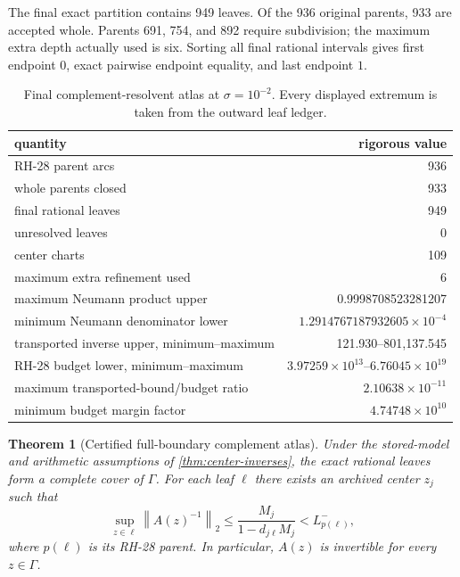 \documentclass[11pt]{article}
\newtheorem{theorem}{Theorem}[section]
\theoremstyle{definition}
\theoremstyle{remark}
\newcommand{\norm}[1]{\left\lVert#1\right\rVert}
\begin{document}
The final exact partition contains 949 leaves.  Of the 936 original parents,
933 are accepted whole.  Parents 691, 754, and 892 require subdivision; the
maximum extra depth actually used is six.  Sorting all final rational
intervals gives first endpoint $0$, exact pairwise endpoint equality, and
last endpoint $1$.

\begin{table}[H]
\centering
\caption{Final complement-resolvent atlas at $\sigma=10^{-2}$.  Every
displayed extremum is taken from the outward leaf ledger.}
\label{tab:atlas}
\begin{tabular}{lr}
\toprule
quantity & rigorous value\\
\midrule
RH-28 parent arcs & 936\\
whole parents closed & 933\\
final rational leaves & 949\\
unresolved leaves & 0\\
center charts & 109\\
maximum extra refinement used & 6\\
maximum Neumann product upper & 0.9998708523281207\\
minimum Neumann denominator lower
 & $1.2914767187932605\times10^{-4}$\\
transported inverse upper, minimum--maximum & 121.930--801,137.545\\
RH-28 budget lower, minimum--maximum
 & $3.97259\times10^{13}$--$6.76045\times10^{19}$\\
maximum transported-bound/budget ratio & $2.10638\times10^{-11}$\\
minimum budget margin factor & $4.74748\times10^{10}$\\
\bottomrule
\end{tabular}
\end{table}

\begin{theorem}[Certified full-boundary complement atlas]
\label{thm:full-atlas}
Under the stored-model and arithmetic assumptions of
\cref{thm:center-inverses}, the exact rational leaves form a complete cover
of $\Gamma$.  For each leaf $\ell$ there exists an archived center $z_j$
such that
\begin{equation}
 \sup_{z\in\ell}\norm{A(z)^{-1}}_2
 \leq\frac{M_j}{1-d_{j\ell}M_j}
 <L_{p(\ell)}^-,
 \label{eq:leaf-closure}
\end{equation}
where $p(\ell)$ is its RH-28 parent.  In particular, $A(z)$ is invertible
for every $z\in\Gamma$.
\end{theorem}
\end{document}

